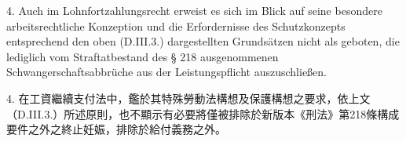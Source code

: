 \documentclass[12pt]{article}
\begin{document}
\begin{sourcepara}[title={原文E.222}]
4. Auch im Lohnfortzahlungsrecht erweist es sich im Blick auf seine besondere arbeitsrechtliche Konzeption und die Erfordernisse des Schutzkonzepts entsprechend den oben (D.III.3.) dargestellten Grundsätzen nicht als geboten, die lediglich vom Straftatbestand des § 218 \abbrStGB{} \abbrNF{} ausgenommenen Schwangerschaftsabbrüche aus der Leistungspflicht auszuschließen.
\end{sourcepara}
\begin{transpara}
4. 在工資繼續支付法中，鑑於其特殊勞動法構想及保護構想之要求，依上文（D.III.3.）所述原則，也不顯示有必要將僅被排除於新版本《刑法》第218條構成要件之外之終止妊娠，排除於給付義務之外。
\end{transpara}
\end{document}
